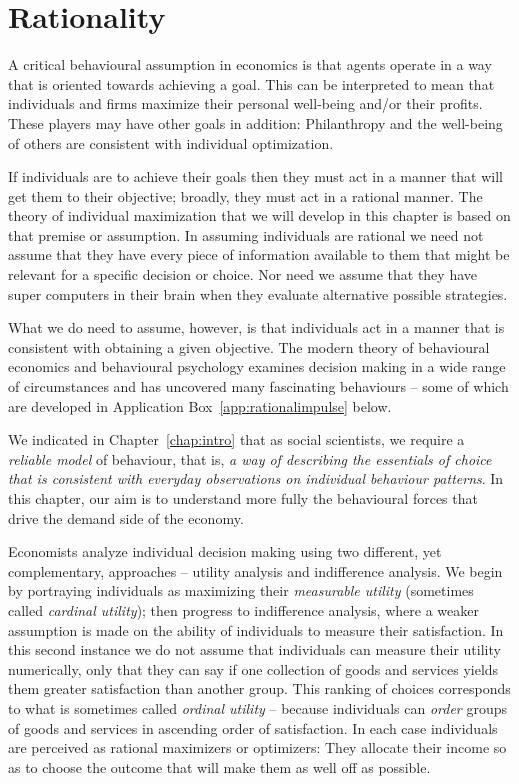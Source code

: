 \section{Rationality}\label{sec:ch6sec1}

A critical behavioural assumption in economics is that agents operate in a
way that is oriented towards achieving a goal. This can be interpreted to
mean that individuals and firms maximize their personal well-being and/or
their profits. These players may have other goals in addition: Philanthropy
and the well-being of others are consistent with individual optimization.

If individuals are to achieve their goals then they must act in a manner
that will get them to their objective; broadly, they must act in a rational
manner. The theory of individual maximization that we will develop in this
chapter is based on that premise or assumption. In assuming individuals are
rational we need not assume that they have every piece of information
available to them that might be relevant for a specific decision or choice.
Nor need we assume that they have super computers in their brain when they
evaluate alternative possible strategies.

What we do need to assume, however, is that individuals act in a manner that
is consistent with obtaining a given objective. The modern theory of
behavioural economics and behavioural psychology examines decision making in
a wide range of circumstances and has uncovered many fascinating behaviours
-- some of which are developed in Application Box~\ref{app:rationalimpulse}
below.

We indicated in Chapter~\ref{chap:intro} that as social scientists, we
require a \textit{reliable model} of behaviour, that is, \textit{a way of
	describing the essentials of choice that is consistent with everyday
	observations on individual behaviour patterns}. In this chapter, our aim is
to understand more fully the behavioural forces that drive the demand side
of the economy.

Economists analyze individual decision making using two different, yet
complementary, approaches -- utility analysis and indifference analysis. We
begin by portraying individuals as maximizing their \textit{measurable
	utility} (sometimes called \textit{cardinal utility}); then progress to
indifference analysis, where a weaker assumption is made on the ability of
individuals to measure their satisfaction. In this second instance we do not
assume that individuals can measure their utility numerically, only that
they can say if one collection of goods and services yields them greater
satisfaction than another group. This ranking of choices corresponds to what
is sometimes called \textit{ordinal utility} -- because individuals can 
\textit{order} groups of goods and services in ascending order of
satisfaction. In each case individuals are perceived as rational maximizers
or optimizers: They allocate their income so as to choose the outcome that
will make them as well off as possible.

